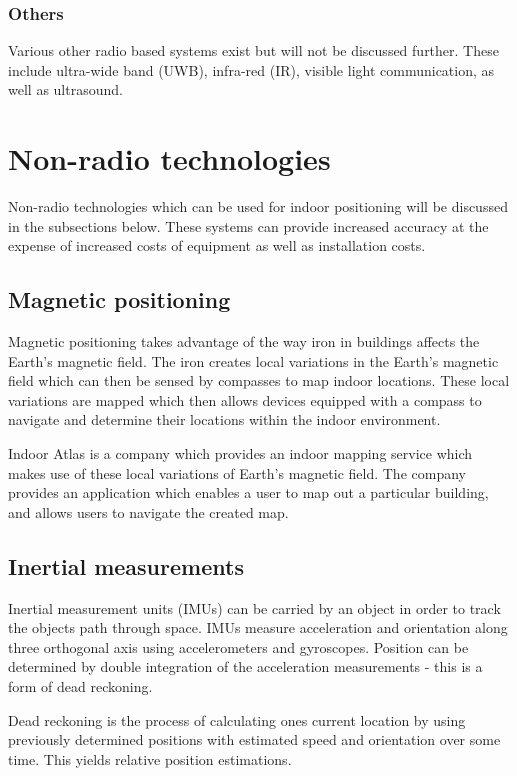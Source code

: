 \documentclass[11pt,a4paper]{report}
\begin{document}
		\subsubsection{Others}
			Various other radio based systems exist but will not be discussed further. These include ultra-wide band (UWB), infra-red (IR), visible light communication, as well as ultrasound.
	
	\section{Non-radio technologies}
		Non-radio technologies which can be used for indoor positioning will be discussed in the subsections below. These systems can provide increased accuracy at the expense of increased costs of equipment as well as installation costs.
	
	\subsection{Magnetic positioning}
		Magnetic positioning takes advantage of the way iron in buildings affects the Earth's magnetic field. The iron creates local variations in the Earth's magnetic field which can then be sensed by compasses to map indoor locations. These local variations are mapped which then allows devices equipped with a compass to navigate and determine their locations within the indoor environment.
		\cite{supreeth_sudhakaran_geospatial_2014}
		
		Indoor Atlas is a company which provides an indoor mapping service which makes use of these local variations of Earth's magnetic field. The company provides an application which enables a user to map out a particular building, and allows users to navigate the created map.
		 
	
	\subsection{Inertial measurements}
		Inertial measurement units (IMUs) can be carried by an object in order to track the objects path through space. IMUs measure acceleration and orientation along three orthogonal axis using accelerometers and gyroscopes. Position can be determined by double integration of the acceleration measurements - this is a form of dead reckoning.
		
		Dead reckoning is the process of calculating ones current location by using previously determined positions with estimated speed and orientation over some time. This yields relative position estimations. 
		
\end{document}
